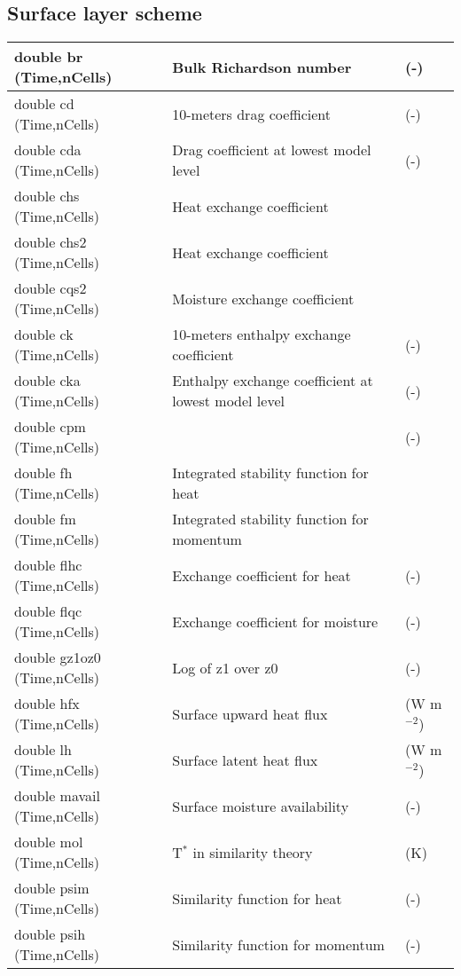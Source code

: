 \subsection{Surface layer scheme}

{\small
\begin{longtable}{|p{2.0in} |p{3.0in} |p{1.0in} |}
\hline
double br (Time,nCells) & Bulk Richardson number & (-) \\ \hline
double cd (Time,nCells) & 10-meters drag coefficient & (-) \\ \hline
double cda (Time,nCells) & Drag coefficient at lowest model level & (-) \\ \hline
double chs (Time,nCells) & Heat exchange coefficient & \\ \hline
double chs2 (Time,nCells) & Heat exchange coefficient & \\ \hline
double cqs2 (Time,nCells) & Moisture exchange coefficient & \\ \hline
double ck (Time,nCells) & 10-meters enthalpy exchange coefficient & (-) \\ \hline
double cka (Time,nCells) &  Enthalpy exchange coefficient at lowest model level & (-) \\ \hline
double cpm (Time,nCells) & & (-) \\ \hline
double fh (Time,nCells) & Integrated stability function for heat & \\ \hline
double fm (Time,nCells) & Integrated stability function for momentum & \\ \hline
double flhc (Time,nCells) & Exchange coefficient for heat & (-) \\ \hline
double flqc (Time,nCells) & Exchange coefficient for moisture & (-) \\ \hline
double gz1oz0 (Time,nCells) & Log of z1 over z0 & (-) \\ \hline
double hfx (Time,nCells) & Surface upward heat flux & (W m$^{-2}$) \\ \hline
double lh (Time,nCells) & Surface latent heat flux & (W m$^{-2}$) \\ \hline
double mavail (Time,nCells) & Surface moisture availability & (-) \\ \hline
double mol (Time,nCells) &  T$^{*}$ in similarity theory & (K) \\ \hline
double psim (Time,nCells) & Similarity function for heat & (-) \\ \hline
double psih (Time,nCells) & Similarity function for momentum & (-) \\ \hline

\end{longtable}}
